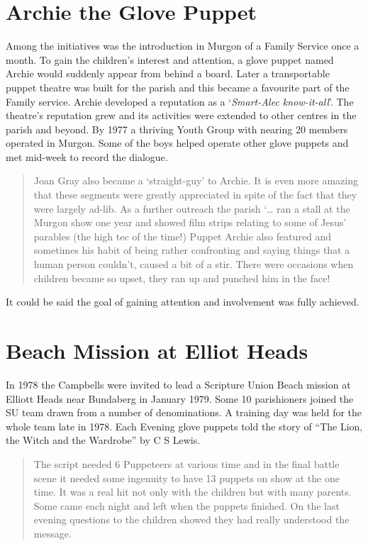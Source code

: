 \section{Archie the Glove Puppet}

Among the initiatives was the introduction in Murgon of a Family Service
once a month. To gain the children's interest and attention, a glove
puppet named Archie would suddenly appear from behind a board. Later a
transportable puppet theatre was built for the parish and this became a
favourite part of the Family service. Archie developed a reputation as a
`\emph{Smart-Alec know-it-all}'. The theatre's reputation grew and its
activities were extended to other centres in the parish and beyond. By
1977 a thriving Youth Group with nearing 20 members operated in Murgon.
Some of the boys helped operate other glove puppets and met mid-week to
record the dialogue\emph{.}

\begin{quote}
Joan Gray also became a `straight-guy' to Archie. It is even more
amazing that these segments were greatly appreciated in spite of the
fact that they were largely ad-lib. As a further outreach the parish
`\ldots{} ran a stall at the Murgon show one year and showed film strips
relating to some of Jesus' parables (the high tec of the time!) Puppet
Archie also featured and sometimes his habit of being rather confronting
and saying things that a human person couldn't, caused a bit of a stir.
There were occasions when children became so upset, they ran up and
punched him in the face!
\end{quote}

It could be said the goal of gaining attention and involvement was fully
achieved.

\section{Beach Mission at Elliot
Heads}

In 1978 the Campbells were invited to lead a Scripture Union Beach
mission at Elliott Heads near Bundaberg in January 1979. Some 10
parishioners joined the SU team drawn from a number of denominations. A
training day was held for the whole team late in 1978. Each Evening
glove puppets told the story of ``The Lion, the Witch and the Wardrobe''
by C S Lewis.

\begin{quote}
The script needed 6 Puppeteers at various time and in the final battle
scene it needed some ingenuity to have 13 puppets on show at the one
time. It was a real hit not only with the children but with many
parents. Some came each night and left when the puppets finished. On the
last evening questions to the children showed they had really understood
the message.
\end{quote}

